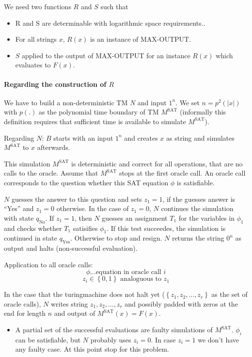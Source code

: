 \documentclass[a4paper]{article}
\newcommand{\set}[1]{\left\{#1\right\}}
\begin{document}
We need two functions $R$ and $S$ such that
\begin{itemize}
  \item R and S are determinable with logarithmic space requirements..
  \item For all strings $x$, $R(x)$ is an instance of MAX-OUTPUT.
  \item $S$ applied to the output of MAX-OUTPUT for an instance $R(x)$
        which evaluates to $F(x)$.
\end{itemize}

\paragraph{Regarding the construction of $R$}
We have to build a non-deterministic TM $N$ and input $1^n$.
We set $n = p^2(|x|)$ with $p(.)$ as the polynomial time boundary
of TM $M^{\text{SAT}}$ (informally this definition requires that
sufficient time is available to simulate $M^{\text{SAT}}$).

Regarding $N$:
$B$ starts with an input $1^n$ and creates $x$ as string and simulates
$M^{\text{SAT}}$ to $x$ afterwards.

This simulation $M^{\text{SAT}}$ is deterministic and correct for all
operations, that are no calls to the oracle.
Assume that $M^{\text{SAT}}$ stops at the first oracle call. An oracle
call corresponds to the question whether this SAT equation $\phi$ is
satisfiable.

$N$ guesses the answer to this question and sets $z_1 = 1$, if the
guesses answer is ``Yes'' and $z_1 = 0$ otherwise.
In the case of $z_1 = 0$, $N$ continues the simulation with state $q_{\text{No}}$.
If $z_1 = 1$, then $N$ guesses an assignment $T_1$ for the variables in
$\phi_1$ and checks whether $T_1$ satisifies $\phi_1$.
If this test succeedes, the simulation is continued in state $q_{\text{Yes}}$.
Otherwise to stop and resign. $N$ returns the string $0^n$ as output and
halts (non-successful evaluation).

Application to all oracle calls:
\[
  \phi \ldots \text{equation in oracle call } i
\] \[
  z_i \in \set{0,1} \text{ analoguous to } z_1
\]

In the case that the turingmachine does not halt yet ($\set{z_1, z_2, \ldots, z_r}$
as the set of oracle calls), $N$ writes string $z_1, z_2, \ldots, z_r$ and
possibly padded with zeros at the end for length $n$ and output of
$M^{\text{SAT}}(x) = F(x)$.

\begin{itemize}
  \item A partial set of the successful evaluations are faulty
        simulations of $M^{\text{SAT}}$. $\phi_i$ can be satisfiable,
        but $N$ probably uses $z_i = 0$. In case $z_i = 1$ we don't have
        any faulty case. At this point stop for this problem.
\end{itemize}
\end{document}
